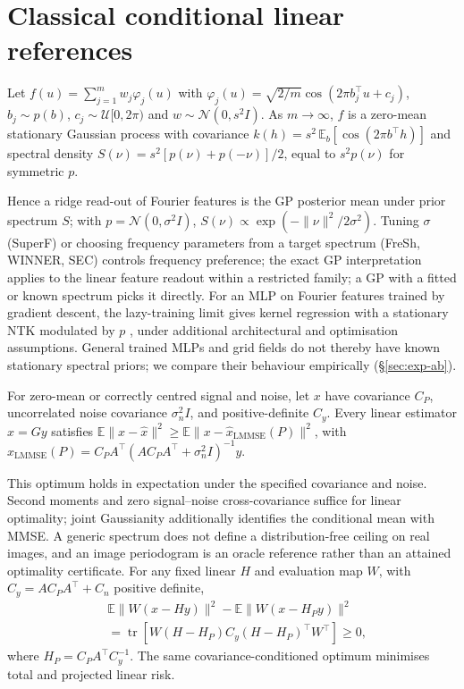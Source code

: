 \section{Classical conditional linear references}\label{app:linear}
\begin{proposition}\label{prop:bochner}
Let $f(u)=\sum_{j=1}^m w_j\varphi_j(u)$ with
$\varphi_j(u)=\sqrt{2/m}\cos(2\pi b_j^\top u+c_j)$, $b_j\sim p(b)$,
$c_j\sim\mathcal{U}[0,2\pi)$ and $w\sim\mathcal{N}(0,s^2I)$. As
$m\to\infty$, $f$ is a zero-mean stationary Gaussian process with covariance
$k(h)=s^2\,\mathbb{E}_b[\cos(2\pi b^\top h)]$ and spectral density
$S(\nu)=s^2[p(\nu)+p(-\nu)]/2$, equal to $s^2p(\nu)$ for symmetric $p$.
\end{proposition}
Hence a ridge read-out of Fourier features is the GP posterior mean under
prior spectrum $S$; with $p=\mathcal{N}(0,\sigma^2I)$,
$S(\nu)\propto\exp(-\|\nu\|^2/2\sigma^2)$. Tuning $\sigma$ (SuperF) or
choosing frequency parameters from a target spectrum (FreSh, WINNER, SEC)
controls frequency preference; the exact GP interpretation applies to the linear feature readout within a restricted family; a GP with a fitted or
known spectrum picks it directly. For an MLP on Fourier features trained by
gradient descent, the lazy-training limit gives kernel regression with a
stationary NTK modulated by $p$ \citep{tancik2020fourier,jacot2018ntk}, under additional architectural and optimisation assumptions. General trained MLPs and grid fields do not thereby have known stationary spectral priors; we compare their behaviour empirically
(\S\ref{sec:exp-ab}).

\begin{proposition}\label{prop:bound}
For zero-mean or correctly centred signal and noise, let $x$ have covariance $C_P$, uncorrelated noise covariance $\sigma_n^2I$, and positive-definite $C_y$. Every linear
estimator $\hat x=Gy$ satisfies
$\mathbb{E}\|x-\hat x\|^2\ge\mathbb{E}\|x-\hat x_{\mathrm{LMMSE}}(P)\|^2$,
with $\hat x_{\mathrm{LMMSE}}(P)=C_PA^\top(AC_PA^\top+\sigma_n^2I)^{-1}y$.
\end{proposition}
This optimum holds in expectation under the specified covariance and noise.
Second moments and zero signal--noise cross-covariance suffice for linear
optimality; joint Gaussianity additionally identifies the conditional mean
with MMSE. A generic spectrum does not define a distribution-free ceiling
on real images, and an image periodogram is an oracle reference rather than
an attained optimality certificate. For any fixed linear $H$ and evaluation
map $W$, with $C_y=AC_PA^\top+C_n$ positive definite,
\begin{align*}
&\mathbb E\|W(x-Hy)\|^2-\mathbb E\|W(x-H_Py)\|^2\\
&=\operatorname{tr}[W(H-H_P)C_y(H-H_P)^\top W^\top]\ge0,
\end{align*}
where $H_P=C_PA^\top C_y^{-1}$. The same covariance-conditioned optimum
minimises total and projected linear risk.


